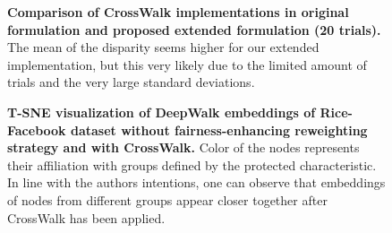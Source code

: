 
\begin{figure}[!htbp]
\caption{\textbf{Comparison of CrossWalk implementations in original formulation and proposed extended formulation (20 trials).} The mean of the disparity seems higher for our extended implementation, but this very likely due to the limited amount of trials and the very large standard deviations.}
\label{fig:ours-vs-theirs}
\end{figure}


\begin{figure}[!htbp]
\caption{\textbf{T-SNE visualization of DeepWalk embeddings of Rice-Facebook dataset without fairness-enhancing reweighting strategy and with CrossWalk.}
Color of the nodes represents their affiliation with groups defined by the protected characteristic. In line with the authors intentions, one can observe that embeddings of nodes from different groups appear closer together after CrossWalk has been applied.}
\label{fig:visualization-embeddings}
\end{figure}
